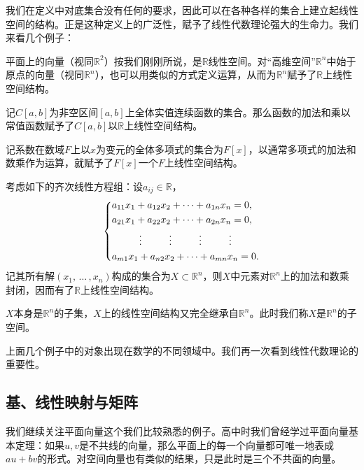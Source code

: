 我们在定义中对底集合没有任何的要求，因此可以在各种各样的集合上建立起线性空间的结构。正是这种定义上的广泛性，赋予了线性代数理论强大的生命力。我们来看几个例子：

平面上的向量（视同$\mathbb{R}^2$）按我们刚刚所说，是$\mathbb{R}$线性空间。对“高维空间”$\mathbb{R}^n$中始于原点的向量（视同$\mathbb{R}^n$），也可以用类似的方式定义运算，从而为$\mathbb{R}^n$赋予了$\mathbb{R}$上线性空间结构。

记$C[a,b]$为非空区间$[a,b]$上全体实值连续函数的集合。那么函数的加法和乘以常值函数赋予了$C[a,b]$以$\mathbb{R}$上线性空间结构。

记系数在数域$F$上以$x$为变元的全体多项式的集合为$F[x]$，以通常多项式的加法和数乘作为运算，就赋予了$F[x]$一个$F$上线性空间结构。

考虑如下的齐次线性方程组：设$a_{ij}\in\mathbb{R}$，
\[
    \begin{dcases}
        a_{11}x_1+a_{12}x_2+\cdots+a_{1n}x_n=0,                               \\
        a_{21}x_1+a_{22}x_2+\cdots+a_{2n}x_n=0,                               \\
        \mbox{}\hfill\vdots\hfill\vdots \hfill\vdots\hfill\vdots\hfill\mbox{} \\
        a_{m1}x_1+a_{n2}x_2+\cdots +a_{mn}x_n=0.
    \end{dcases}
\]
记其所有解$(x_1,\,\dots\,,x_n)$构成的集合为$X\subset \mathbb{R}^n$，则$X$中元素对$\mathbb{R}^n$上的加法和数乘封闭，因而有了$\mathbb{R}$上线性空间结构。

$X$本身是$\mathbb{R}^n$的子集，$X$上的线性空间结构又完全继承自$\mathbb{R}^n$。此时我们称$X$是$\mathbb{R}^n$的子空间。

上面几个例子中的对象出现在数学的不同领域中。我们再一次看到线性代数理论的重要性。

\subsection{基、线性映射与矩阵}
我们继续关注平面向量这个我们比较熟悉的例子。高中时我们曾经学过平面向量基本定理：如果$u,v$是不共线的向量，那么平面上的每一个向量都可唯一地表成$au+bv$的形式。对空间向量也有类似的结果，只是此时是三个不共面的向量。

\begin{center}
\end{center}

